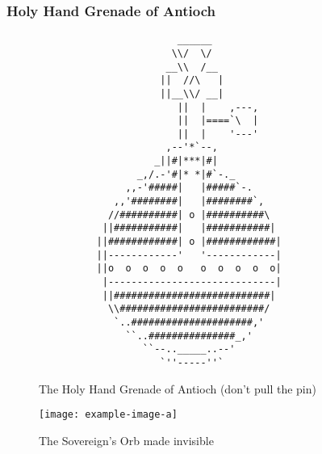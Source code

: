 \documentclass{metanorma}
\begin{document}


\subsubsection{Holy Hand Grenade of Antioch}
\label{holy_hand_grenade}



\begin{figure}[h]\centering
\label{hand-grenade-figure}
\caption{The Holy Hand Grenade of Antioch (don't pull the pin)}
\begin{verbatim}
                        ______
                       \\/  \/
                      __\\  /__
                     ||  //\   |
                     ||__\\/ __|
                        ||  |    ,---,
                        ||  |====`\  |
                        ||  |    '---'
                      ,--'*`--,
                    _||#|***|#|
                 _,/.-'#|* *|#`-._
               ,,-'#####|   |#####`-.
             ,,'########|   |########`,
            //##########| o |##########\
           ||###########|   |###########|
          ||############| o |############|
          ||------------'   '------------|
          ||o  o  o  o  o   o  o  o  o  o|
           |-----------------------------|
           ||###########################|
            \\#########################/
             `..#####################,'
               ``..###############_,'
                  ``--.._____..--'
                     `''-----''`
\end{verbatim}
\end{figure}




\begin{figure}[h]\centering
  \label{sovereign-orb}
  \caption{The Sovereign's Orb made invisible}
  \texttt{[image: example-image-a]}
\end{figure}
\end{document}
